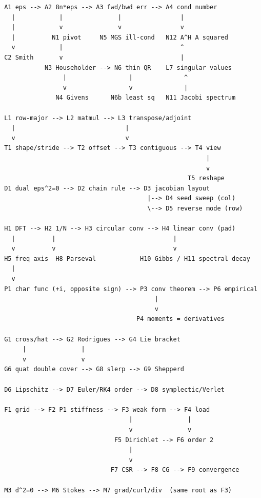 \begin{verbatim}
 A1 eps --> A2 8n*eps --> A3 fwd/bwd err --> A4 cond number
   |            |               |                |
   |            v               v                v
   |          N1 pivot     N5 MGS ill-cond   N12 A^H A squared
   v            |                                ^
 C2 Smith       v                                |
            N3 Householder --> N6 thin QR    L7 singular values
                 |                 |              ^
                 v                 v              |
               N4 Givens      N6b least sq   N11 Jacobi spectrum

 L1 row-major --> L2 matmul --> L3 transpose/adjoint
   |                              |
   v                              v
 T1 shape/stride --> T2 offset --> T3 contiguous --> T4 view
                                                        |
                                                        v
                                                   T5 reshape
 D1 dual eps^2=0 --> D2 chain rule --> D3 jacobian layout
                                        |--> D4 seed sweep (col)
                                        \--> D5 reverse mode (row)

 H1 DFT --> H2 1/N --> H3 circular conv --> H4 linear conv (pad)
   |          |                                |
   v          v                                v
 H5 freq axis  H8 Parseval            H10 Gibbs / H11 spectral decay
   |
   v
 P1 char func (+i, opposite sign) --> P3 conv theorem --> P6 empirical
                                          |
                                          v
                                     P4 moments = derivatives

 G1 cross/hat --> G2 Rodrigues --> G4 Lie bracket
      |               |
      v               v
 G6 quat double cover --> G8 slerp --> G9 Shepperd

 D6 Lipschitz --> D7 Euler/RK4 order --> D8 symplectic/Verlet

 F1 grid --> F2 P1 stiffness --> F3 weak form --> F4 load
                                   |               |
                                   v               v
                               F5 Dirichlet --> F6 order 2
                                   |
                                   v
                              F7 CSR --> F8 CG --> F9 convergence

 M3 d^2=0 --> M6 Stokes --> M7 grad/curl/div  (same root as F3)
\end{verbatim}


